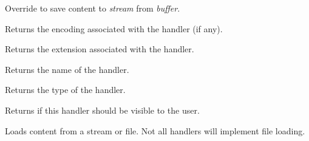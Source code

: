 \label{wxrichtextfilehandlerdosavefile}


Override to save content to {\it stream} from {\it buffer}.

\label{wxrichtextfilehandlergetencoding}


Returns the encoding associated with the handler (if any).

\label{wxrichtextfilehandlergetextension}


Returns the extension associated with the handler.

\label{wxrichtextfilehandlergetname}


Returns the name of the handler.

\label{wxrichtextfilehandlergettype}


Returns the type of the handler.

\label{wxrichtextfilehandlerisvisible}


Returns \true if this handler should be visible to the user.

\label{wxrichtextfilehandlerloadfile}



Loads content from a stream or file. Not all handlers will implement file loading.

\label{wxrichtextfilehandlersavefile}


